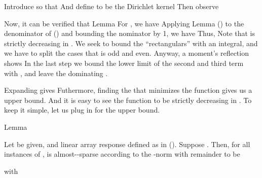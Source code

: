 Introduce
so that
And define  to be the Dirichlet kernel
Then observe

Now, it can be verified that
\Result
{Lemma}
{
For , we have
}
Applying Lemma () to the denominator of () and bounding the nominator by 1, we have
Thus,
Note that  is strictly decreasing in .
We seek to bound the ``rectangulars'' with an integral, and we have to split the cases that  is odd and even.
Anyway, a moment's reflection shows
In the last step we bound the lower limit of the second and third term with , and leave the dominating .

Expanding  gives
Futhermore, finding the  that minimizes the function gives us a upper bound.
And it is easy to see the function to be strictly decreasing in .
To keep it simple, let us plug in  for the upper bound.

\Result
{Lemma}
{
Let  be given, and linear array response  defined as in ().
Suppose .
Then, for all instances of \m {\f},  is almost--sparse according to the -norm with remainder  to be

with
}

